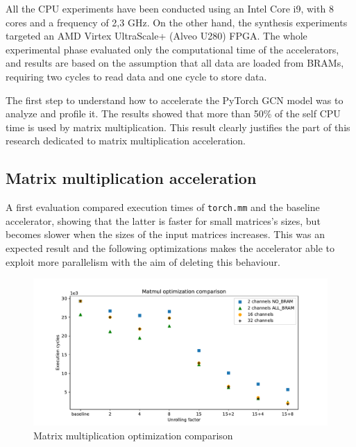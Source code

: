 \documentclass[11pt,a4paper,twocolumn]{article}
\begin{document}
All the CPU experiments have been conducted using an Intel Core i9, with 8 cores and a frequency of 2,3 GHz.
On the other hand, the synthesis experiments targeted an AMD Virtex UltraScale+ (Alveo U280) FPGA\@.
The whole experimental phase evaluated only the computational time of the accelerators, and results are based on the assumption that all data are loaded from BRAMs, requiring two cycles to read data and one cycle to store data.

The first step to understand how to accelerate the PyTorch GCN model was to analyze and profile it.
The results showed that more than 50\% of the self CPU time is used by matrix multiplication.
This result clearly justifies the part of this research dedicated to matrix multiplication acceleration.

\subsection{Matrix multiplication acceleration}
\label{subsec:matmul}%

A first evaluation compared execution times of \lstinline{torch.mm} and the baseline accelerator, showing that the latter is faster for small matrices's sizes, but becomes slower when the sizes of the input matrices increases.
This was an expected result and the following optimizations makes the accelerator able to exploit more parallelism with the aim of deleting this behaviour.

\begin{figure}[t]
    \centering
    \includegraphics[height=0.24\textwidth]{Images/matmul_comparison15}
    \caption{Matrix multiplication optimization comparison}
    \label{fig:matmul-opts-comparison}
\end{figure}
\end{document}
